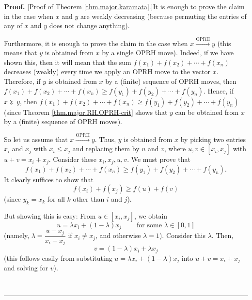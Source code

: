 \documentclass[numbers=enddot,12pt,final,onecolumn,notitlepage]{scrartcl}%
\numberwithin{exer}{subsection}
\theoremstyle{definition}
\newenvironment{proof}[1][Proof]{\noindent\textbf{#1.} }{\ \rule{0.5em}{0.5em}}
\begin{document}
\begin{proof}
[Proof of Theorem \ref{thm.major.karamata}.]It is enough to prove the claim in
the case when $x$ and $y$ are weakly decreasing (because permuting the entries
of any of $x$ and $y$ does not change anything).

Furthermore, it is enough to prove the claim in the case when
$x\overset{\text{OPRH}}{\longrightarrow}y$ (this means that $y$ is obtained
from $x$ by a single OPRH move). Indeed, if we have shown this, then it will
mean that the sum $f\left(  x_{1}\right)  +f\left(  x_{2}\right)
+\cdots+f\left(  x_{n}\right)  $ decreases (weakly) every time we apply an
OPRH move to the vector $x$. Therefore, if $y$ is obtained from $x$ by a
(finite) sequence of OPRH moves, then $f\left(  x_{1}\right)  +f\left(
x_{2}\right)  +\cdots+f\left(  x_{n}\right)  \geq f\left(  y_{1}\right)
+f\left(  y_{2}\right)  +\cdots+f\left(  y_{n}\right)  $. Hence, if
$x\succcurlyeq y$, then $f\left(  x_{1}\right)  +f\left(  x_{2}\right)
+\cdots+f\left(  x_{n}\right)  \geq f\left(  y_{1}\right)  +f\left(
y_{2}\right)  +\cdots+f\left(  y_{n}\right)  $ (since Theorem
\ref{thm.major.RH.OPRH-crit} shows that $y$ can be obtained from $x$ by a
(finite) sequence of OPRH moves).

So let us assume that $x\overset{\text{OPRH}}{\longrightarrow}y$. Thus, $y$ is
obtained from $x$ by picking two entries $x_{i}$ and $x_{j}$ with $x_{i}\leq
x_{j}$ and replacing them by $u$ and $v$, where $u,v\in\left[  x_{i}%
,x_{j}\right]  $ with $u+v=x_{i}+x_{j}$. Consider these $x_{i},x_{j},u,v$. We
must prove that%
\[
f\left(  x_{1}\right)  +f\left(  x_{2}\right)  +\cdots+f\left(  x_{n}\right)
\geq f\left(  y_{1}\right)  +f\left(  y_{2}\right)  +\cdots+f\left(
y_{n}\right)  .
\]
It clearly suffices to show that%
\[
f\left(  x_{i}\right)  +f\left(  x_{j}\right)  \geq f\left(  u\right)
+f\left(  v\right)
\]
(since $y_{k}=x_{k}$ for all $k$ other than $i$ and $j$).

But showing this is easy: From $u\in\left[  x_{i},x_{j}\right]  $, we obtain
\[
u=\lambda x_{i}+\left(  1-\lambda\right)  x_{j}\ \ \ \ \ \ \ \ \ \ \text{for
some }\lambda\in\left[  0,1\right]
\]
(namely, $\lambda=\dfrac{u-x_{j}}{x_{i}-x_{j}}$ if $x_{i}\neq x_{j}$, and
otherwise $\lambda=1$). Consider this $\lambda$. Then,%
\[
v=\left(  1-\lambda\right)  x_{i}+\lambda x_{j}%
\]
(this follows easily from substituting $u=\lambda x_{i}+\left(  1-\lambda
\right)  x_{j}$ into $u+v=x_{i}+x_{j}$ and solving for $v$).


\end{proof}
\end{document}
